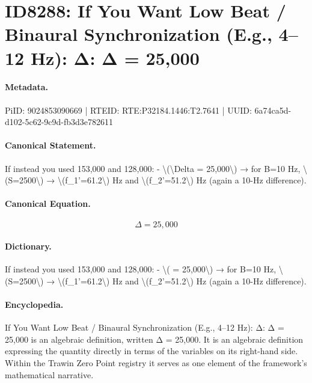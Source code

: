 \section*{ID8288: If You Want Low Beat / Binaural Synchronization (E.g., 4–12 Hz): Δ: Δ = 25,000}
\paragraph{Metadata.}
PiID: 9024853090669 | RTEID: RTE:P32184.1446:T2.7641 | UUID: 6a74ca5d-d102-5c62-9c9d-fb3d3e782611

\paragraph{Canonical Statement.}
If instead you used 153,000 and 128,000: - \textbackslash{}(\textbackslash{}Delta = 25,000\textbackslash{}) → for B=10 Hz, \textbackslash{}(S=2500\textbackslash{}) → \textbackslash{}(f\_1'=61.2\textbackslash{}) Hz and \textbackslash{}(f\_2'=51.2\textbackslash{}) Hz (again a 10-Hz difference).

\paragraph{Canonical Equation.}
\[
\Delta = 25,000
\]

\paragraph{Dictionary.}
If instead you used 153,000 and 128,000: - \textbackslash{}( = 25,000\textbackslash{}) → for B=10 Hz, \textbackslash{}(S=2500\textbackslash{}) → \textbackslash{}(f\_1'=61.2\textbackslash{}) Hz and \textbackslash{}(f\_2'=51.2\textbackslash{}) Hz (again a 10-Hz difference).

\paragraph{Encyclopedia.}
If You Want Low Beat / Binaural Synchronization (E.g., 4–12 Hz): Δ: Δ = 25,000 is an algebraic definition, written Δ = 25,000. It is an algebraic definition expressing the quantity directly in terms of the variables on its right-hand side. Within the Trawin Zero Point registry it serves as one element of the framework's mathematical narrative.
